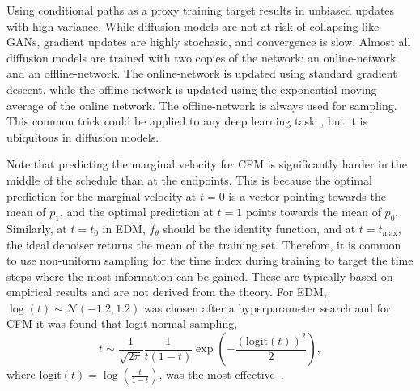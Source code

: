 Using conditional paths as a proxy training target results in unbiased updates with high variance.
While diffusion models are not at risk of collapsing like GANs, gradient updates are highly stochasic, and convergence is slow.
Almost all diffusion models are trained with two copies of the network: an online-network and an offline-network.
The online-network is updated using standard gradient descent, while the offline network is updated using the exponential moving average of the online network.
The offline-network is always used for sampling.
This common trick could be applied to any deep learning task~\cite{Adam}, but it is ubiquitous in diffusion models.

Note that predicting the marginal velocity for CFM is significantly harder in the middle of the schedule than at the endpoints.
This is because the optimal prediction for the marginal velocity at $t=0$ is a vector pointing towards the mean of $p_1$, and the optimal prediction at $t=1$ points towards the mean of $p_0$.
Similarly, at $t=t_0$ in EDM, $f_\theta$ should be the identity function, and at $ t=t_\text{max}$, the ideal denoiser returns the mean of the training set.
Therefore, it is common to use non-uniform sampling for the time index during training to target the time steps where the most information can be gained.
These are typically based on empirical results and are not derived from the theory.
For EDM, $\log(t) \sim \mathcal{N}(-1.2, 1.2)$ was chosen after a hyperparameter search and for CFM it was found that logit-normal sampling,
\begin{equation}
 t \sim \frac{1}{\sqrt{2\pi}}\frac{1}{t(1-t)}\exp\left(-\frac{(\text{logit}(t))^2}{2}\right),
\end{equation}
where $\text{logit}(t) = \log\left(\frac{t}{1-t}\right)$, was the most effective~\cite{SD3}.

